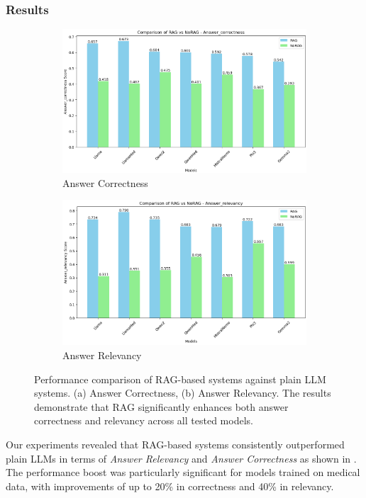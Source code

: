 \subsubsection{Results}
%
\begin{figure}[h]
    \centering
    \begin{subfigure}{0.9\textwidth}
        \includegraphics[width=\textwidth]{figures/RAGvsNoRAG_correctness}
        \caption{Answer Correctness}
        \label{fig:ragvsnorag_correctness}
    \end{subfigure}
        \begin{subfigure}{0.9\textwidth}
        \includegraphics[width=\textwidth]{figures/RAGvsNoRAG_relevancy}
        \caption{Answer Relevancy}
        \label{fig:ragvsnorag_relevancy}
    \end{subfigure}
    \caption[Performance comparison of \gls{RAG}-based systems against plain \gls{LLM} systems]{
      Performance comparison of \gls{RAG}-based systems against plain \gls{LLM} systems.
      (a) Answer Correctness, (b) Answer Relevancy.
      The results demonstrate that \gls{RAG} significantly enhances both answer correctness and relevancy across all tested models.
    }
    \label{fig:ragvsnorag}
\end{figure}
%
Our experiments revealed that \gls{RAG}-based systems consistently outperformed plain \glspl{LLM} in terms of \textit{Answer Relevancy} and \textit{Answer Correctness} as shown in .
%
The performance boost was particularly significant for models trained on medical data, with improvements of up to 20\% in correctness and 40\% in relevancy.

